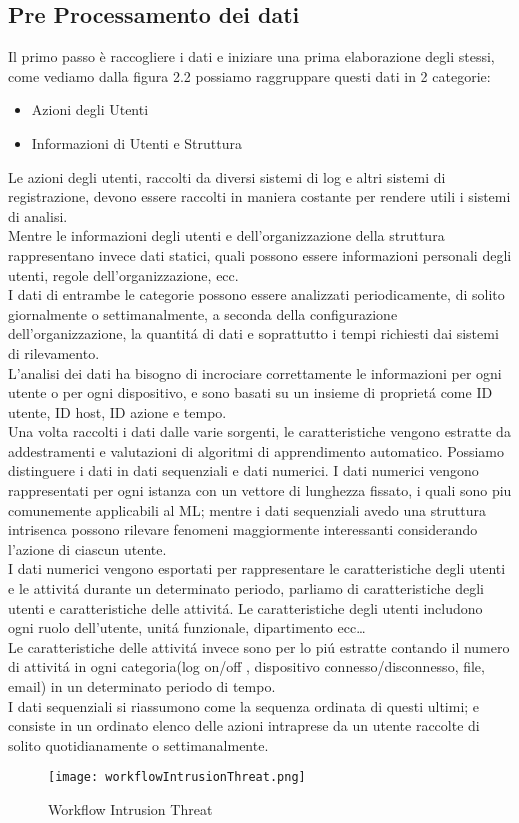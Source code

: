\documentclass[../tesi.tex]{subfiles}
\begin{document}
\subsection{Pre Processamento dei dati}
Il primo passo è raccogliere i dati e iniziare una prima elaborazione degli stessi, come vediamo dalla figura 2.2 possiamo raggruppare questi dati in 2 categorie: 
\begin{itemize}
\item Azioni degli Utenti
\item Informazioni di Utenti e Struttura
\end{itemize}
 Le azioni degli utenti, raccolti da diversi sistemi di log e altri sistemi di registrazione, devono essere raccolti in maniera costante per rendere utili i sistemi di analisi.\\
 Mentre le informazioni degli utenti e dell’organizzazione della struttura rappresentano invece dati statici, quali possono essere informazioni personali degli utenti, regole dell’organizzazione, ecc.\\
I dati di entrambe le categorie possono essere analizzati periodicamente, di solito giornalmente o settimanalmente, a seconda della configurazione dell’organizzazione, la quantitá di dati e soprattutto i tempi richiesti dai sistemi di rilevamento.\\
L’analisi dei dati ha bisogno di incrociare correttamente le informazioni per ogni utente o per ogni dispositivo, e sono basati su un insieme di proprietá come ID utente, ID host, ID azione e tempo.\\
Una volta raccolti i dati dalle varie sorgenti, le caratteristiche vengono estratte da addestramenti e valutazioni di algoritmi di apprendimento automatico.
Possiamo distinguere i dati in dati sequenziali e dati numerici. I dati numerici vengono rappresentati per ogni istanza con un vettore di lunghezza fissato, i quali sono piu comunemente applicabili al ML; mentre i dati sequenziali avedo una struttura intrisenca possono rilevare fenomeni maggiormente interessanti considerando l’azione di ciascun utente.\\
I dati numerici vengono esportati per rappresentare le caratteristiche degli utenti e le attivitá durante un determinato periodo, parliamo di caratteristiche degli utenti e caratteristiche delle attivitá.
Le caratteristiche degli utenti includono ogni ruolo dell’utente, unitá funzionale, dipartimento ecc…\\
Le caratteristiche delle attivitá invece sono per lo piú estratte contando il numero di attivitá in ogni categoria(log on/off , dispositivo connesso/disconnesso, file, email) in un determinato periodo di tempo.\\
I dati sequenziali si riassumono come la sequenza ordinata di questi ultimi; e consiste in un ordinato elenco delle azioni intraprese da un utente raccolte di solito quotidianamente o settimanalmente.
\cite{le2020analyzing}\\
\begin{figure}[htbp]
\center
\texttt{[image: workflowIntrusionThreat.png]}
\caption{Workflow Intrusion Threat} 
\end{figure}
\end{document}
